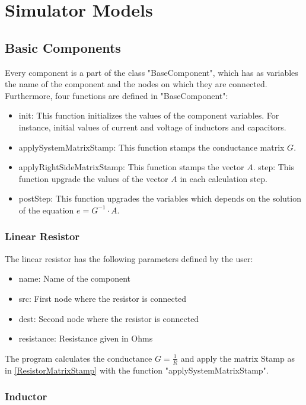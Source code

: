 \chapter{Simulator Models}

\section{Basic Components}

Every component is a part of the class "BaseComponent", which has as variables the name of the component and the nodes on which they are connected. Furthermore, four functions are defined in "BaseComponent":

\begin{itemize}
\item init: This function initializes the values of the component variables. For  instance, initial values of current and voltage of inductors and capacitors.

\item applySystemMatrixStamp: This function stamps the conductance matrix $G$.

\item applyRightSideMatrixStamp: This function stamps the vector $A$.
step: This function upgrade the values of the vector $A$ in each calculation step.

\item postStep: This function upgrades the variables which depends on the solution of the equation $e=G^{-1} \cdot A$.
\end{itemize}

\subsection{Linear Resistor}
The linear resistor has the following parameters defined by the user:
\begin{itemize}
\item name: Name of the component
\item src: First node where the resistor is connected
\item dest: Second node where the resistor is connected
\item resistance: Resistance given in Ohms
\end{itemize}
The program calculates the conductance $G = \frac{1}{R}$ and apply the matrix Stamp as in \ref{ResistorMatrixStamp} with the function "applySystemMatrixStamp".


\subsection{Inductor}

